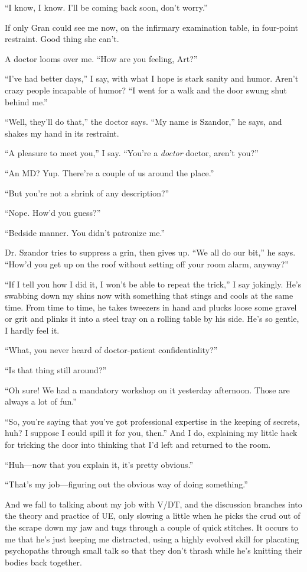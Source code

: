 “I know, I know. I’ll be coming back soon, don’t worry.”

If only Gran could see me now, on the infirmary examination table,
in four-point restraint. Good thing she can’t.

A doctor looms over me. “How are you feeling, Art?”

“I’ve had better days,” I say, with what I hope is stark sanity and
humor. Aren’t crazy people incapable of humor? “I went for a walk
and the door swung shut behind me.”

“Well, they’ll do that,” the doctor says. “My name is Szandor,” he
says, and shakes my hand in its restraint.

“A pleasure to meet you,” I say. “You’re a \emph{doctor} doctor,
aren’t you?”

“An MD? Yup. There’re a couple of us around the place.”

“But you’re not a shrink of any description?”

“Nope. How’d you guess?”

“Bedside manner. You didn’t patronize me.”

Dr. Szandor tries to suppress a grin, then gives up. “We all do our
bit,” he says. “How’d you get up on the roof without setting off
your room alarm, anyway?”

“If I tell you how I did it, I won’t be able to repeat the trick,”
I say jokingly. He’s swabbing down my shins now with something that
stings and cools at the same time. From time to time, he takes
tweezers in hand and plucks loose some gravel or grit and plinks it
into a steel tray on a rolling table by his side. He’s so gentle, I
hardly feel it.

“What, you never heard of doctor-patient confidentiality?”

“Is that thing still around?”

“Oh sure! We had a mandatory workshop on it yesterday afternoon.
Those are always a lot of fun.”

“So, you’re saying that you’ve got professional expertise in the
keeping of secrets, huh? I suppose I could spill it for you, then.”
And I do, explaining my little hack for tricking the door into
thinking that I’d left and returned to the room.

“Huh—now that you explain it, it’s pretty obvious.”

“That’s my job—figuring out the obvious way of doing something.”

And we fall to talking about my job with V/DT, and the discussion
branches into the theory and practice of UE, only slowing a little
when he picks the crud out of the scrape down my jaw and tugs
through a couple of quick stitches. It occurs to me that he’s just
keeping me distracted, using a highly evolved skill for placating
psychopaths through small talk so that they don’t thrash while he’s
knitting their bodies back together.


